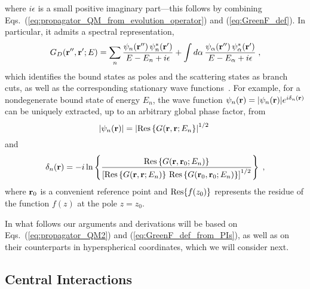 \documentclass[a4paper,preprint,draft,showpacs,amsmath,amsfonts,amssymb,aps,prd]{revtex4}%
\begin{document}
where $i\epsilon$ is a small positive imaginary part---this follows by combining
Eqs.~(\ref{eq:propagator_QM_from_evolution_operator})
 and (\ref{eq:GreenF_def}).
In particular, it
admits a spectral representation,
\begin{equation}
G_{D} ({\bf r}'', {\bf r}' ; E) 
=
\sum_{n}
\frac{ 
\psi_{n} ({\bf r}'')  \, \psi_{n} ^{*}({\bf r}')  
}{E-E_{n} +i \epsilon}
+
\int d \alpha
\,
\frac{
\psi_{\alpha} ({\bf r}'')  \, \psi_{\alpha} ^{*}({\bf r}')  
}{E-E_{\alpha} +i \epsilon}
\;  ,
\label{eq:energy_propagator_states}
\end{equation}
which identifies
the bound states as poles and the scattering states 
as branch cuts, as well as the corresponding
stationary wave functions~\cite{kleinert}.
For example,
for a nondegenerate bound state of energy $E_{n}$,
the wave function
$\psi_{n}({\bf r}) =
|\psi_{n}({\bf r}) |
e^{i \delta_{n}({\bf r})}$
can be uniquely extracted, up to an arbitrary global phase factor, from
\begin{equation}
|\psi_{n}({\bf r}) |
=
\left|
{\rm Res} \left\{ G({\bf r},{\bf r}; E_{n} 
\right\}
\right|^{1/2}
\;  
\label{eq:residue_magnitude_wf}
\end{equation}
and
\begin{equation}
\delta_{n}({\bf r}) 
=
- i \ln
\left\{
\frac{
{\rm Res} \left\{ G({\bf r},{\bf r}_{0}; E_{n} ) \right\}
}{
\left[
{\rm Res} \left\{ G({\bf r},{\bf r}; E_{n} )\right\}
\,
{\rm Res} \left\{ G({\bf r}_{0},{\bf r}_{0}; E_{n} )\right\}
\right]^{1/2}
}
\right\}
\;  ,
\label{eq:residue_phase_wf}
\end{equation}
where ${\bf r}_{0}$ is a convenient reference
point and ${\rm Res} \{ f(z_{0}) \}$ represents the residue of the function
$f(z)$ at the pole $z=z_{0}$.

In what follows 
our arguments and derivations will be based on Eqs.~(\ref{eq:propagator_QM2})
and (\ref{eq:GreenF_def_from_PIs}),
as well as on their counterparts in hyperspherical coordinates, which we will 
consider next.


\subsection{Central Interactions}
\label{sec:central_interactions}
\end{document}
